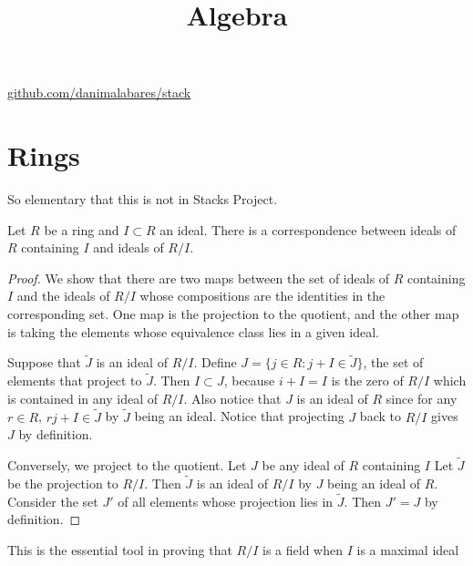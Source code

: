 



\title{Algebra}
\maketitle

\label{section-phantom}
\hfill
\href{http://github.com/danimalabares/stack}{github.com/danimalabares/stack}

\tableofcontents

\section{Rings}
\label{section-rings}

\noindent
So elementary that this is not in Stacks Project.

\begin{theorem}
\label{theorem-ideals-quotient-correspondence}
Let $R$ be a ring and $I \subset R$ an ideal.
There is a correspondence between ideals of $R$ containing $I$ 
and ideals of $R/I$.
\end{theorem}

\begin{proof}
We show that there are two maps between the set of ideals of $R$ 
containing $I$ and the ideals of $R/I$ whose compositions
are the identities in the corresponding set. One map is the projection
to the quotient, and the other map is taking the elements
whose equivalence class lies in a given ideal.

Suppose that $\tilde{J}$ is an ideal of $R/I$.
Define $J=\{j \in R : j+I \in \tilde{J}\}$, 
the set of elements that project to $\tilde{J}$.
Then $I \subset J$, because $i + I = I$ is the zero of $R/I$ 
which is contained in any ideal of $R/I$.
Also notice that $J$ is an ideal of $R$ since for any $r \in R$,
$rj+I \in \tilde{J}$ by $\tilde{J}$ being an ideal.
Notice that projecting $J$ back to $R/I$ gives $J$
by definition.

Conversely, we project to the quotient.
Let $J$ be any ideal of $R$ containing $I$ 
Let $\tilde{J}$ be the projection to $R/I$.
Then $\tilde{J}$ is an ideal of $R/I$ by $J$ being an ideal of $R$.
Consider the set $J'$ of all elements whose projection lies in $\tilde{J}$.
Then $J'=J$ by definition.
\end{proof}

\noindent
This is the essential tool in proving that $R/I$ is a field
when $I$ is a maximal ideal

